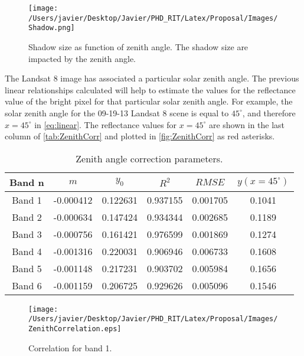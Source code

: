 \begin{figure}[!ht]
    \centering
    \texttt{[image: /Users/javier/Desktop/Javier/PHD\_RIT/Latex/Proposal/Images/Shadow.png]}
  \caption{Shadow size as function of zenith angle. The shadow size are impacted by the zenith angle. \label{fig:shadow} } 
\end{figure}

The Landsat 8 image has associated a particular solar zenith angle. The previous linear relationships calculated will help to estimate the values for the reflectance value of the bright pixel for that particular solar zenith angle. For example, the solar zenith angle for the 09-19-13 Landsat 8 scene is equal to $45^\circ$, and therefore $x=45^\circ$ in \autoref{eq:linear}. The reflectance values for $x=45^\circ$ are shown in the last column of \autoref{tab:ZenithCorr} and plotted in \autoref{fig:ZenithCorr} as red asterisks.
\begin{table}[htb]
\caption{ Zenith angle correction parameters. \label{tab:ZenithCorr} } 
\centering
\begin{tabular}{c|c|c|c|c|c} 
 \bfseries{Band n} & \bfseries{$m$}      & \bfseries{$y_0$}    & \bfseries{$R^2$}     & \bfseries{$RMSE$} & $y(x=45^\circ)$   \\ \hline \hline
 Band 1 & -0.000412 & 0.122631 & 0.937155 & 0.001705 &  0.1041\\
 Band 2 & -0.000634 & 0.147424 & 0.934344 & 0.002685 &  0.1189\\
 Band 3 & -0.000756 & 0.161421 & 0.976599 & 0.001869 &  0.1274\\
 Band 4 & -0.001316 & 0.220031 & 0.906946 & 0.006733 &  0.1608\\
 Band 5 & -0.001148 & 0.217231 & 0.903702 & 0.005984 &  0.1656\\
 Band 6 & -0.001159 & 0.206725 & 0.929626 & 0.005096 &  0.1546\\  
 \end{tabular}
\end{table}

\begin{figure}[htb]
  	\centering
  	\texttt{[image: /Users/javier/Desktop/Javier/PHD\_RIT/Latex/Proposal/Images/ZenithCorrelation.eps]}
  \caption{Correlation for band 1. \label{fig:Band1Corr} } 
\end{figure}

